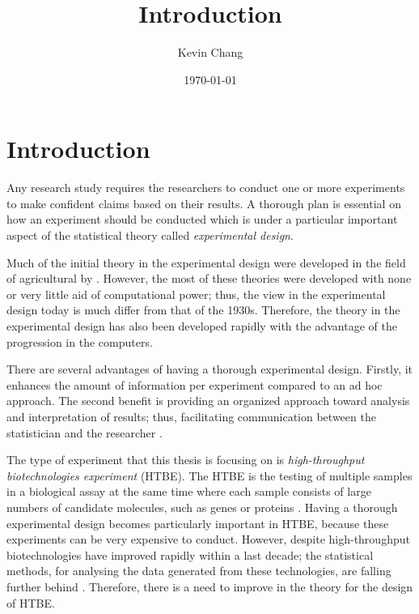 \documentclass[11pt,a4paper]{article}
\begin{document}
\title{Introduction}
\author{Kevin Chang}
\date{\today}
\maketitle


\section{Introduction}
Any research study requires the researchers to conduct one or more experiments to make confident claims based on their results. A thorough plan is essential on how an experiment should be conducted which is under a particular important aspect of the statistical theory called \emph{experimental design}. 

Much of the initial theory in the experimental design were developed in the field of agricultural by \cite{Fisher1935}. However, the most of these theories were developed with none or very little aid of computational power; thus, the view in the experimental design today is much differ from that of the 1930s. Therefore, the theory in the experimental design has also been developed rapidly with the advantage of the progression in the computers. 
 
There are several advantages of having a thorough experimental design. Firstly, it enhances the amount of information per experiment compared to an ad hoc approach. The second benefit is providing an organized approach toward analysis and interpretation of results; thus, facilitating communication between the statistician and the researcher \citep{Doyle2009}. 

The type of experiment that this thesis is focusing on is \emph{high-throughput biotechnologies experiment} (HTBE). The HTBE is the testing of multiple samples in a biological assay at the same time where each sample consists of large numbers of candidate molecules, such as genes or proteins \citep{Janzen2002}. Having a thorough experimental design becomes particularly important in HTBE, because these experiments can be very expensive to conduct. However, despite high-throughput biotechnologies have improved rapidly within a last decade; the statistical methods, for analysing the data generated from these technologies, are falling further behind \citep{Doyle2009}. Therefore, there is a need to improve in the theory for the design of HTBE. 
\end{document}
